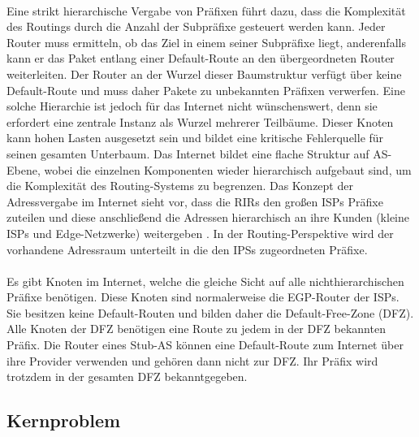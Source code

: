 \paragraph{}
Eine strikt hierarchische Vergabe von Präfixen führt dazu, dass die Komplexität des Routings durch die Anzahl der Subpräfixe gesteuert werden kann. Jeder Router muss ermitteln, ob das Ziel in einem seiner Subpräfixe liegt, anderenfalls kann er das Paket entlang einer Default-Route an den übergeordneten Router weiterleiten. Der Router an der Wurzel dieser Baumstruktur verfügt über keine Default-Route und muss daher Pakete zu unbekannten Präfixen verwerfen. Eine solche Hierarchie ist jedoch für das Internet nicht wünschenswert, denn sie erfordert eine zentrale Instanz als Wurzel mehrerer Teilbäume. Dieser Knoten kann hohen Lasten ausgesetzt sein und bildet eine kritische Fehlerquelle für seinen gesamten Unterbaum. Das Internet bildet eine flache Struktur auf AS-Ebene, wobei die einzelnen Komponenten wieder hierarchisch aufgebaut sind, um die Komplexität des Routing-Systems zu begrenzen. Das Konzept der Adressvergabe im Internet sieht vor, dass die RIRs den großen ISPs Präfixe zuteilen und diese anschließend die Adressen hierarchisch an ihre Kunden (kleine ISPs und Edge-Netzwerke) weitergeben \cite{ripe:ipv4}. In der Routing-Perspektive wird der vorhandene Adressraum unterteilt in die den IPSs zugeordneten Präfixe. 

\paragraph{}
Es gibt Knoten im Internet, welche die gleiche Sicht auf alle nichthierarchischen Präfixe benötigen. Diese Knoten sind normalerweise die EGP-Router der ISPs. Sie besitzen keine Default-Routen und bilden daher die Default-Free-Zone (DFZ). Alle Knoten der DFZ benötigen eine Route zu jedem in der DFZ bekannten Präfix. Die Router eines Stub-AS können eine Default-Route zum Internet über ihre Provider verwenden und gehören dann nicht zur DFZ. Ihr Präfix wird trotzdem in der gesamten DFZ bekanntgegeben. 

\subsection{Kernproblem}
